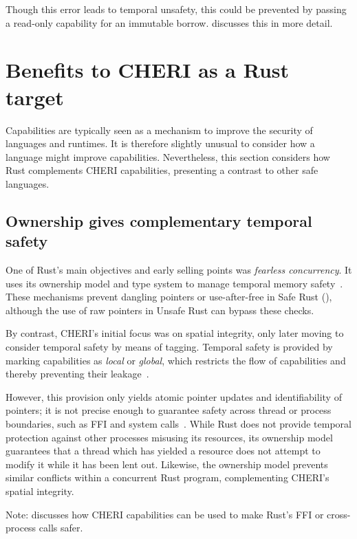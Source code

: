 \documentclass[dissertation.tex]{subfiles}
\begin{document}
Though this error leads to temporal unsafety, this could be prevented by
passing a read-only capability for an immutable borrow.
 discusses this in more detail.


\section{Benefits to CHERI as a Rust target}
\label{sec:eval-cheri}

Capabilities are typically seen as a mechanism to improve the security
of languages and runtimes.
It is therefore slightly unusual to consider how a language might
improve capabilities.
Nevertheless, this section considers how Rust complements CHERI
capabilities, presenting a contrast to other safe languages.

\subsection{Ownership gives complementary temporal safety}
\label{sec:eval-cheri-spatial-temporal}

One of Rust's main objectives and early selling points was
\emph{fearless concurrency}.
It uses its ownership model and type system to manage temporal memory
safety~\cite{rust-trpl-book}.
These mechanisms prevent dangling pointers or use-after-free in Safe
Rust (), although the use of raw pointers in
Unsafe Rust can bypass these checks.

By contrast, CHERI's initial focus was on spatial integrity, only later
moving to consider temporal safety by means of tagging.
Temporal safety is provided by marking capabilities as \emph{local} or
\emph{global}, which restricts the flow of capabilities and thereby
preventing their leakage~\cite{cheri2015}.

However, this provision only yields atomic pointer updates and
identifiability of pointers;
it is not precise enough to guarantee safety across thread or process
boundaries, such as FFI and system calls~\cite{cheri-2019-abstract}.
While Rust does not provide temporal protection against other processes
misusing its resources, its ownership model guarantees that a thread
which has yielded a resource does not attempt to modify it while it has
been lent out.
Likewise, the ownership model prevents similar conflicts within a
concurrent Rust program, complementing CHERI's spatial integrity.

Note:  discusses how CHERI capabilities can
be used to make Rust's FFI or cross-process calls safer.
\end{document}
